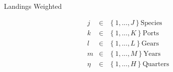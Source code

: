 \documentclass[ xcolor = pdftex, dvipsnames, table ]{beamer}
\begin{document}
\begin{frame}{Landings Weighted}
\begin{minipage}[h!]{0.39\textwidth}
\end{minipage}
\begin{minipage}{0.3\textwidth}
\begin{eqnarray*}
j &\in&\left\{1, ..., J\right\} \text{Species}\\
k &\in&\left\{1, ..., K\right\} \text{Ports}\\
l &\in&\left\{1, ..., L\right\} \text{Gears}\\
m &\in&\left\{1, ..., M\right\} \text{Years}\\
\eta &\in&\left\{1, ..., H\right\} \text{Quarters}
\end{eqnarray*}
\end{minipage}
\end{frame}

%
%
\end{document}
